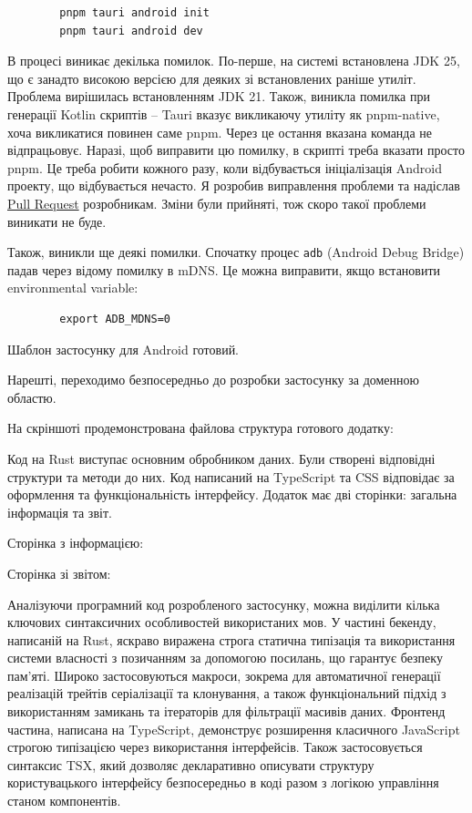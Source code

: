\documentclass[14pt, a4paper]{extreport}
\begin{document}
	\begin{verbatim}
		pnpm tauri android init
		pnpm tauri android dev
	\end{verbatim}
	
	В процесі виникає декілька помилок. По-перше, на системі встановлена JDK 25, що є занадто високою версією для деяких зі встановлених раніше утиліт. Проблема вирішилась встановленням JDK 21. Також, виникла помилка при генерації Kotlin скриптів -- Tauri вказує викликаючу утиліту як pnpm-native, хоча викликатися повинен саме pnpm. Через це остання вказана команда не відпрацьовує. Наразі, щоб виправити цю помилку, в скрипті треба вказати просто pnpm. Це треба робити кожного разу, коли відбувається ініціалізація Android проекту, що відбувається нечасто. Я розробив виправлення проблеми та надіслав \href{https://github.com/tauri-apps/tauri/pull/16078}{Pull Request} розробникам. Зміни були прийняті, тож скоро такої проблеми виникати не буде.
	
	
	Також, виникли ще деякі помилки. Спочатку процес \texttt{adb} (Android Debug Bridge) падав через відому помилку в mDNS. Це можна виправити, якщо встановити environmental variable:
	
	\begin{verbatim}
		export ADB_MDNS=0
	\end{verbatim}
	
	Шаблон застосунку для Android готовий.
	
	
	Нарешті, переходимо безпосередньо до розробки застосунку за доменною областю.
	
	На скріншоті продемонстрована файлова структура готового додатку:
	
	
	Код на Rust виступає основним обробником даних. Були створені відповідні структури та методи до них. Код написаний на TypeScript та CSS відповідає за оформлення та функціональність інтерфейсу. Додаток має дві сторінки: загальна інформація та звіт.
	
	Сторінка з інформацією:
	
	
	Сторінка зі звітом:
	
	
	Аналізуючи програмний код розробленого застосунку, можна виділити кілька ключових синтаксичних особливостей використаних мов. У частині бекенду, написаній на Rust, яскраво виражена строга статична типізація та використання системи власності з позичанням за допомогою посилань, що гарантує безпеку пам'яті. Широко застосовуються макроси, зокрема для автоматичної генерації реалізацій трейтів серіалізації та клонування, а також функціональний підхід з використанням замикань та ітераторів для фільтрації масивів даних. Фронтенд частина, написана на TypeScript, демонструє розширення класичного JavaScript строгою типізацією через використання інтерфейсів. Також застосовується синтаксис TSX, який дозволяє декларативно описувати структуру користувацького інтерфейсу безпосередньо в коді разом з логікою управління станом компонентів.
	
\end{document}
